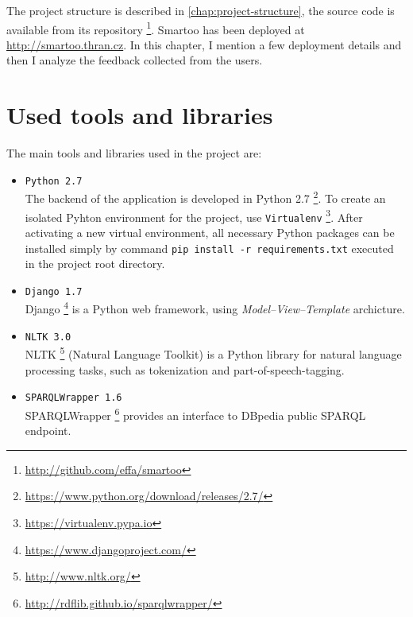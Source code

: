 \documentclass[12pt, twoside]{fithesis2}		%
\renewcommand{\_}{\leavevmode \kern0.07em\vbox{\hrule width0.4em}}
\newcommand{\squarebullet}{\textcolor{black}{\raisebox{0.15em}{\rule{4pt}{4pt}}}}
\newcommand{\emptysquarebullet}{\textcolor{black}{\raisebox{0.10em}{\tiny$\square$}}}
\newenvironment{myItemize}{
  \begin{itemize}[leftmargin=2em,rightmargin=1em,itemsep=\parskip ,parsep=0em,topsep=0em,partopsep=0em]
  \renewcommand{\labelitemi}{\squarebullet}
  \renewcommand{\labelitemii}{\textbullet}
}{
  \end{itemize}
}
\begin{document}
The project structure is described in \autoref{chap:project-structure},
the source code is available from its repository%
\footnote{\url{http://github.com/effa/smartoo}}.
Smartoo has been deployed at \url{http://smartoo.thran.cz}.
In this chapter, I mention a few deployment details
and then I analyze the feedback collected from the users.

\section{Used tools and libraries}
\label{sec:tools}

The main tools and libraries used in the project are:
\begin{myItemize}
\item \texttt{Python 2.7}\\
The backend of the application is developed in Python 2.7%
\footnote{\url{https://www.python.org/download/releases/2.7/}}.
To create an isolated Pyhton environment for the project, use \texttt{Virtualenv}%
\footnote{\url{https://virtualenv.pypa.io}}.
After activating a new virtual environment, all necessary Python packages can be installed simply by
command \texttt{pip install -r requirements.txt} executed in the project root directory.

\item \texttt{Django 1.7}\\
Django%
\footnote{\url{https://www.djangoproject.com/}}
is a Python web framework, using \emph{Model--View--Template} archicture.


\item \texttt{NLTK 3.0}\\
NLTK%
\footnote{\url{http://www.nltk.org/}}
(Natural Language Toolkit) is a Python library for natural language processing tasks,
such as tokenization and part-of-speech-tagging.

\item \texttt{SPARQLWrapper 1.6}\\
SPARQLWrapper%
\footnote{\url{http://rdflib.github.io/sparqlwrapper/}}
provides an interface to DBpedia public SPARQL endpoint.


\end{myItemize}
\end{document}
